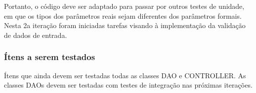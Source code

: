 \documentclass[11pt, a4paper]{book}
\begin{document}
Portanto, o código deve ser adaptado para passar por outros testes de unidade, em que os tipos dos parâmetros reais sejam diferentes dos parâmetros formais.
Nesta 2a iteração foram iniciadas tarefas visando à implementação da validação de dados de entrada.

\subsubsection{Ítens a serem testados}

Ítens que ainda devem ser testadas todas as classes DAO e CONTROLLER.
As classes DAOs devem ser testadas com testes de integração nas próximas iterações.

\backmatter \singlespacing   


\end{document}
